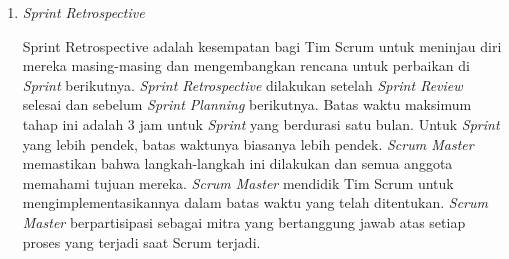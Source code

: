 \begin{enumerate}
	\item \textit{Sprint Retrospective}
	
	Sprint Retrospective adalah kesempatan bagi Tim Scrum untuk meninjau diri mereka masing-masing dan mengembangkan rencana untuk perbaikan di \textit{Sprint} berikutnya. \textit{Sprint Retrospective} dilakukan setelah \textit{Sprint Review} selesai dan sebelum \textit{Sprint Planning} berikutnya. Batas waktu maksimum tahap ini adalah 3 jam untuk \textit{Sprint} yang berdurasi satu bulan. Untuk \textit{Sprint} yang lebih pendek, batas waktunya biasanya lebih pendek. \textit{Scrum Master} memastikan bahwa langkah-langkah ini dilakukan dan semua anggota memahami tujuan mereka. \textit{Scrum Master} mendidik Tim Scrum untuk mengimplementasikannya dalam batas waktu yang telah ditentukan. \textit{Scrum Master} berpartisipasi sebagai mitra yang bertanggung jawab atas setiap proses yang terjadi saat Scrum terjadi.

\end{enumerate}

